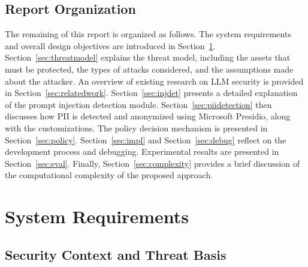 \documentclass[conference]{IEEEtran}
\begin{document}

\subsection{Report Organization}

The remaining of this report is organized as follows. The system requirements and overall design objectives are introduced in Section~\ref{sec:requirements}. Section~\ref{sec:threatmodel} explains the threat model, including the assets that must be protected, the types of attacks considered, and the assumptions made about the attacker. An overview of existing research on LLM security is provided in Section~\ref{sec:relatedwork}. %
Section~\ref{sec:injdet} presents a detailed explanation of the prompt injection detection module. Section~\ref{sec:piidetection} then discusses how PII is detected and anonymized using Microsoft Presidio, along with the customizations. The policy decision mechanism is presented in Section~\ref{sec:policy}. Section~\ref{sec:impl} and Section~\ref{sec:debug} reflect on the development process and debugging. Experimental results are presented in Section~\ref{sec:eval}. Finally, Section~\ref{sec:complexity} provides a brief discussion of the computational complexity of the proposed approach.

\section{System Requirements}
\label{sec:requirements}


\subsection{Security Context and Threat Basis}
\end{document}
